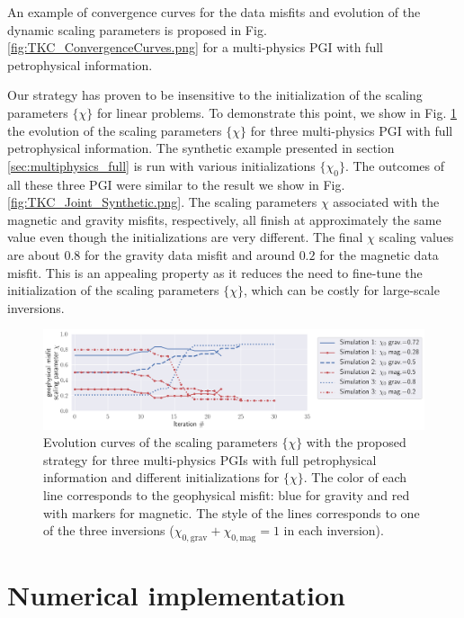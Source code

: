 \documentclass[extra, mreferee]{gji_joint} %
\begin{document}
An example of convergence curves for the data misfits and evolution of the dynamic scaling parameters is proposed in Fig. \ref{fig:TKC_ConvergenceCurves.png} for a multi-physics PGI with full petrophysical information.

Our strategy has proven to be insensitive to the initialization of the scaling parameters $\{\chi\}$ for linear problems. To demonstrate this point, we show in Fig. \ref{fig:TKC_ChiCurves.png} the evolution of the scaling parameters $\{\chi\}$ for three multi-physics PGI with full petrophysical information. The synthetic example presented in section \ref{sec:multiphysics_full} is run with various initializations $\{\chi_0\}$. The outcomes of all these three PGI were similar to the result we show in Fig. \ref{fig:TKC_Joint_Synthetic.png}. The scaling parameters $\chi$ associated with the magnetic and gravity misfits, respectively, all finish at approximately the same value even though the initializations are very different. The final $\chi$ scaling values are about $0.8$ for the gravity data misfit and around $0.2$ for the magnetic data misfit. This is an appealing property as it reduces the need to fine-tune the initialization of the scaling parameters $\{\chi\}$, which can be costly for large-scale inversions.

\begin{figure}
\centering
\includegraphics[width=\columnwidth]{Fig/LowRes/TKC_ChiCurves.png}
\caption{Evolution curves of the scaling parameters $\{\chi\}$ with the proposed strategy for three multi-physics PGIs with full petrophysical information and different initializations for $\{\chi\}$. The color of each line corresponds to the geophysical misfit: blue for gravity and red with markers for magnetic. The style of the lines corresponds to one of the three inversions ($\chi_{0,\text{grav}}+\chi_{0,\text{mag}}=1$ in each inversion).}
\label{fig:TKC_ChiCurves.png}
\end{figure}


\section{Numerical implementation}
\end{document}
